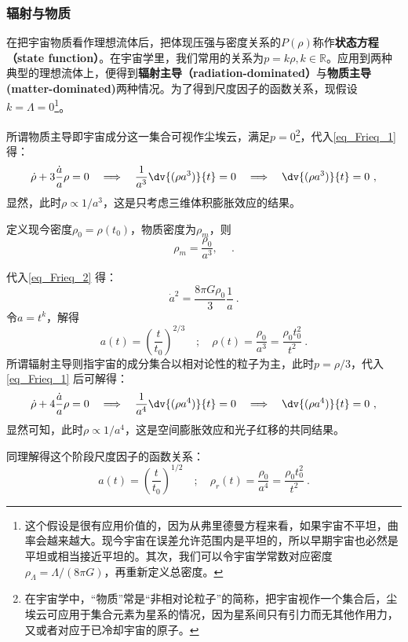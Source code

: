 \subsubsection{辐射与物质}
在把宇宙物质看作理想流体后，把体现压强与密度关系的$P(\rho)$称作\textbf{状态方程（state function）}。在宇宙学里，我们常用的关系为$p=k\rho,k\in \mathbb R$。应用到两种典型的理想流体上，便得到\textbf{辐射主导（radiation-dominated）}与\textbf{物质主导(matter-dominated)}两种情况。为了得到尺度因子的函数关系，现假设$k=\Lambda=0$\footnote{这个假设是很有应用价值的，因为从弗里德曼方程来看，如果宇宙不平坦，曲率会越来越大。现今宇宙在误差允许范围内是平坦的，所以早期宇宙也必然是平坦或相当接近平坦的。其次，我们可以令宇宙学常数对应密度$\rho_{\Lambda}=\Lambda/(8\pi G)$，再重新定义总密度。}。

所谓物质主导即宇宙成分这一集合可视作尘埃云，满足$p=0$\footnote{在宇宙学中，“物质”常是“非相对论粒子”的简称，把宇宙视作一个集合后，尘埃云可应用于集合元素为星系的情况，因为星系间只有引力而无其他作用力，又或者对应于已冷却宇宙的原子。}，代入\autoref{eq_Frieq_1} 得：
\begin{equation}\dot{\rho}+3\frac{\dot{a}}{a}\rho=0\quad\Longrightarrow\quad\frac1{a^3}\dv{(\rho a^3)}{t}=0\quad\Longrightarrow\quad\dv{(\rho a^3)}{t}=0 ~,\end{equation}
显然，此时$\rho\propto 1/a^3$，这是只考虑三维体积膨胀效应的结果。

定义现今密度$\rho_0=\rho(t_0)$，物质密度为$\rho_m$，则
\begin{equation}
\rho_m=\frac{\rho_0}{a^3},\quad ~.
\end{equation}

代入\autoref{eq_Frieq_2} 得：
\begin{equation}
\dot{a}^2=\frac{8\pi G\rho_0}3\frac1a ~.
\end{equation}
令$a=t^k$，解得
\begin{equation}a(t)=\left(\frac{t}{t_0}\right)^{2/3}\quad;\quad\rho(t)=\frac{\rho_0}{a^3}=\frac{\rho_0t_0^2}{t^2}~.\end{equation}
所谓辐射主导则指宇宙的成分集合以相对论性的粒子为主，此时$p=\rho/3$，代入\autoref{eq_Frieq_1} 后可解得：
\begin{equation}\dot{\rho}+4\frac{\dot{a}}{a}\rho=0\quad\Longrightarrow\quad\frac1{a^4}\dv{(\rho a^4)}{t}=0\quad\Longrightarrow\quad\dv{(\rho a^4)}{t} =0~,\end{equation}
显然可知，此时$\rho\propto  1/a^4$，这是空间膨胀效应和光子红移的共同结果。

同理解得这个阶段尺度因子的函数关系：
\begin{equation}
a(t)=\left(\frac{t}{t_0}\right)^{1/2}\quad;\quad\rho_r(t)=\frac{\rho_0}{a^4}=\frac{\rho_0t_0^2}{t^2} ~.
\end{equation}

